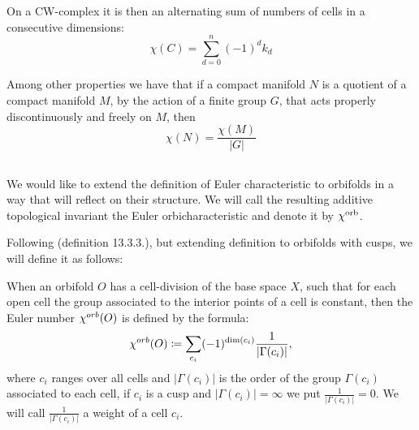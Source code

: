 On a CW-complex it is then an alternating sum of numbers of cells in 
a consecutive dimensions: 
\begin{equation}
\chi(C) = \sum_{d = 0}^n (-1)^d k_d
\end{equation}

Among other properties we have that if a compact manifold $N$ is a quotient of a compact 
manifold $M$, 
by the action of a finite group $G$, that acts properly discontinuously and freely on $M$, then
\begin{equation}
\chi(N) = \frac{\chi(M)}{|G|}
\end{equation}   


\subsection{\Eoc}\label{Eoc}\label{extended_Euler_orbicharacteristic}
We would like to extend the definition of Euler characteristic to orbifolds in a way 
that will reflect on their structure. 
We will call the resulting additive topological invariant the Euler orbicharacteristic 
and denote it by $\chi^{\rm orb}$.


Following \cite{Thurston1979} (definition 13.3.3.), but extending 
definition to orbifolds with cusps, we will define it as follows:
\begin{definition}
When an orbifold $O$ has a cell-division of the base space $X$, such that for each
open cell the group associated to
the interior points of a cell is constant, then the Euler number ${\chi^{orb}(O)}$ is defined by
the formula:
\begin{equation}
{\chi^{orb}(O)} \coloneqq \sum_{c_i} (-1)^{ \mathrm{dim}(c_i)}\frac{1}{|\Gamma(c_i)|},
\end{equation}
where $c_i$ ranges over all cells and $|\Gamma(c_i)|$ is the order of the group $\Gamma(c_i)$ 
associated to each cell, if $c_i$ is a cusp and $|\Gamma(c_i)| = \infty$ we put 
$\frac{1}{|\Gamma(c_i)|} = 0$. We will call $\frac{1}{|\Gamma(c_i)|}$ a weight of a cell $c_i$.
\end{definition} 

